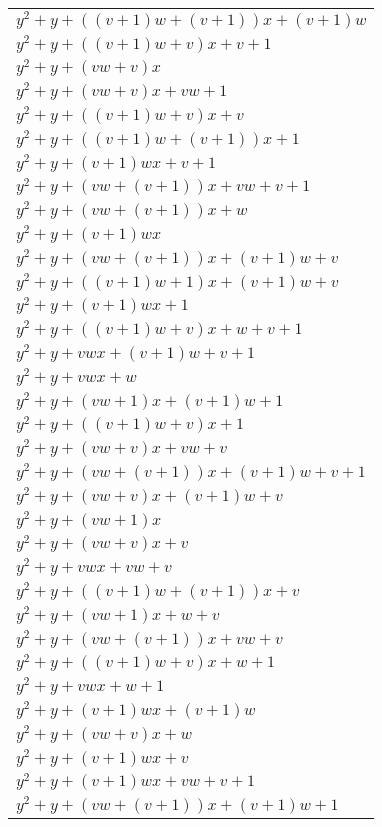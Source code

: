 \begin{center}
\begin{longtable}{|l|}
	$y^2 + y + ((v + 1)w + (v + 1))x + (v + 1)w$ \\
	$y^2 + y + ((v + 1)w + v)x + v + 1$ \\
	$y^2 + y + (vw + v)x$ \\
	$y^2 + y + (vw + v)x + vw + 1$ \\
	$y^2 + y + ((v + 1)w + v)x + v$ \\
	$y^2 + y + ((v + 1)w + (v + 1))x + 1$ \\
	$y^2 + y + (v + 1)wx + v + 1$ \\
	$y^2 + y + (vw + (v + 1))x + vw + v + 1$ \\
	$y^2 + y + (vw + (v + 1))x + w$ \\
	$y^2 + y + (v + 1)wx$ \\
	$y^2 + y + (vw + (v + 1))x + (v + 1)w + v$ \\
	$y^2 + y + ((v + 1)w + 1)x + (v + 1)w + v$ \\
	$y^2 + y + (v + 1)wx + 1$ \\
	$y^2 + y + ((v + 1)w + v)x + w + v + 1$ \\
	$y^2 + y + vwx + (v + 1)w + v + 1$ \\
	$y^2 + y + vwx + w$ \\
	$y^2 + y + (vw + 1)x + (v + 1)w + 1$ \\
	$y^2 + y + ((v + 1)w + v)x + 1$ \\
	$y^2 + y + (vw + v)x + vw + v$ \\
	$y^2 + y + (vw + (v + 1))x + (v + 1)w + v + 1$ \\
	$y^2 + y + (vw + v)x + (v + 1)w + v$ \\
	$y^2 + y + (vw + 1)x$ \\
	$y^2 + y + (vw + v)x + v$ \\
	$y^2 + y + vwx + vw + v$ \\
	$y^2 + y + ((v + 1)w + (v + 1))x + v$ \\
	$y^2 + y + (vw + 1)x + w + v$ \\
	$y^2 + y + (vw + (v + 1))x + vw + v$ \\
	$y^2 + y + ((v + 1)w + v)x + w + 1$ \\
	$y^2 + y + vwx + w + 1$ \\
	$y^2 + y + (v + 1)wx + (v + 1)w$ \\
	$y^2 + y + (vw + v)x + w$ \\
	$y^2 + y + (v + 1)wx + v$ \\
	$y^2 + y + (v + 1)wx + vw + v + 1$ \\
	$y^2 + y + (vw + (v + 1))x + (v + 1)w + 1$ \\

\end{longtable}
\end{center}
